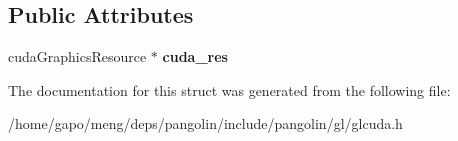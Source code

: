 \subsection*{Public Attributes}
\begin{DoxyCompactItemize}
\item 
cuda\+Graphics\+Resource $\ast$ {\bfseries cuda\+\_\+res}\hypertarget{structpangolin_1_1_gl_buffer_cuda_ptr_a9c2198ee3178205fb6a704cbf2d42ff5}{}\label{structpangolin_1_1_gl_buffer_cuda_ptr_a9c2198ee3178205fb6a704cbf2d42ff5}

\end{DoxyCompactItemize}


The documentation for this struct was generated from the following file\+:\begin{DoxyCompactItemize}
\item 
/home/gapo/meng/deps/pangolin/include/pangolin/gl/glcuda.\+h\end{DoxyCompactItemize}
